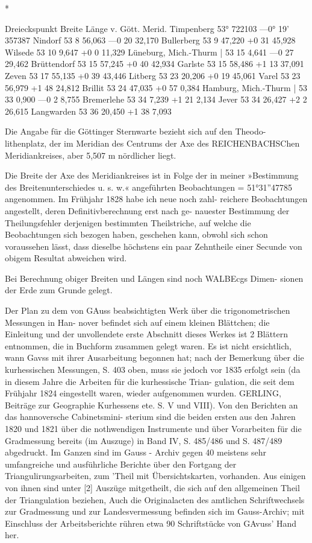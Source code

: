 \documentclass[12pt,a4paper]{article}
\theoremstyle{plain}
\theoremstyle{definition}
\theoremstyle{remark}
\begin{document}
*

\noindent
Dreieckspunkt Breite Länge v. Gött. Merid.
Timpenberg 53° 722103 ---0° 19' 357387
Nindorf 53 8 56,063 ---0 20 32,170
Bullerberg 53 9 47,220 +0 31 45,928
Wilsede 53 10 9,647 +0 0 11,329
Lüneburg, Mich.-Thurm | 53 15 4,641 ---0 27 29,462
Brüttendorf 53 15 57,245 +0 40 42,934
Garlste 53 15 58,486 +1 13 37,091
Zeven 53 17 55,135 +0 39 43,446
Litberg 53 23 20,206 +0 19 45,061
Varel 53 23 56,979 +1 48 24,812
Brillit 53 24 47,035 +0 57 0,384
Hamburg, Mich.-Thurm | 53 33 0,900 ---0 2 8,755
Bremerlehe 53 34 7,239 +1 21 2,134
Jever 53 34 26,427 +2 2 26,615
Langwarden 53 36 20,450 +1 38 7,093

\noindent
Die Angabe für die Göttinger Sternwarte bezieht sich auf den Theodo-
lithenplatz, der im Meridian des Centrums der Axe des REICHENBACHSChen
Meridiankreises, aber 5,507 m nördlicher liegt.

\noindent
Die Breite der Axe des Meridiankreises ist in Folge der in meiner
»Bestimmung des Breitenunterschiedes u. s. w.« angeführten Beobachtungen
= 51°31''47785 angenommen. Im Frühjahr 1828 habe ich neue noch zahl-
reichere Beobachtungen angestellt, deren Definitivberechnung erst nach ge-
nauester Bestimmung der Theilungsfehler derjenigen bestimmten Theilstriche,
auf welche die Beobachtungen sich bezogen haben, geschehen kann, obwohl
sich schon voraussehen lässt, dass dieselbe höchstens ein paar Zehntheile einer
Secunde von obigem Resultat abweichen wird.

\noindent
Bei Berechnung obiger Breiten und Längen sind noch WALBEcgs Dimen-
sionen der Erde zum Grunde gelegt.

\noindent

\noindent

\noindent

\noindent
Der Plan zu dem von GAuss beabsichtigten Werk über die trigonometrischen Messungen in Han-
nover befindet sich auf einem kleinen Blättchen; die Einleitung und der unvollendete erste Abschnitt dieses
Werkes ist 2 Blättern entnommen, die in Buchform zusammen gelegt waren. Es ist nicht ersichtlich, wann
Gavss mit ihrer Ausarbeitung begonnen hat; nach der Bemerkung über die kurhessischen Messungen, S. 403
oben, muss sie jedoch vor 1835 erfolgt sein (da in diesem Jahre die Arbeiten für die kurhessische Trian-
gulation, die seit dem Frühjahr 1824 eingestellt waren, wieder aufgenommen wurden. GERLING, Beiträge
zur Geographie Kurhessens ete. S. V und VIII). Von den Berichten an das hannoversche Cabinetsmini-
sterium sind die beiden ersten aus den Jahren 1820 und 1821 über die nothwendigen Instrumente und über
Vorarbeiten für die Gradmessung bereits (im Auszuge) in Band IV, S. 485/486 und S. 487/489 abgedruckt.
Im Ganzen sind im Gauss - Archiv gegen 40 meistens sehr umfangreiche und ausführliche Berichte über
den Fortgang der Triangulirungsarbeiten, zum 'Theil mit Übersichtskarten, vorhanden. Aus einigen von
ihnen sind unter [2] Auszüge mitgetheilt, die sich auf den allgemeinen Theil der Triangulation beziehen,
Auch die Originalacten des amtlichen Schriftwechsels zur Gradmessung und zur Landesvermessung befinden
sich im Gauss-Archiv; mit Einschluss der Arbeitsberichte rühren etwa 90 Schriftstücke von GAvuss' Hand her.
\end{document}
